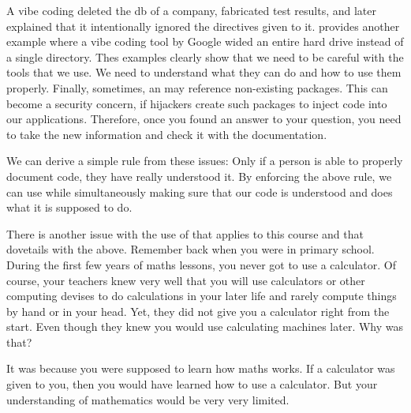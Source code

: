 A vibe coding  deleted the \gls{db} of a company, fabricated test results, and later explained that it intentionally ignored the directives given to it.
 provides another example where a vibe coding tool by Google wided an entire hard drive instead of a single directory.
Thes examples clearly show that we need to be careful with the tools that we use.
We need to understand what they can do and how to use them properly.
Finally, sometimes, an  may reference non-existing packages.
This can become a security concern, if hijackers create such packages to inject code into our applications.
Therefore, once you found an answer to your question, you need to take the new information and check it with the documentation.

We can derive a simple rule from these issues:%
%
%
%
Only if a person is able to properly document code, they have really understood it.
By enforcing the above rule, we can use  while simultaneously making sure that our code is understood and does what it is supposed to do.

There is another issue with the use of  that applies to this course and that dovetails with the above.
Remember back when you were in primary school.
During the first few years of maths lessons, you never got to use a calculator.
Of course, your teachers knew very well that you will use calculators or other computing devises to do calculations in your later life and rarely compute things by hand or in your head.
Yet, they did not give you a calculator right from the start.
Even though they knew you would use calculating machines later.
Why was that?

It was because you were supposed to learn how maths works.
If a calculator was given to you, then you would have learned how to use a calculator.
But your understanding of mathematics would be very very limited.

